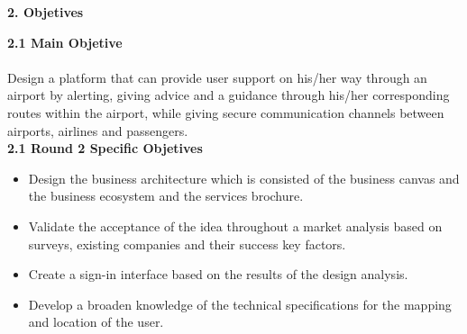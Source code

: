 \documentclass[]{article}
\begin{document}
\Large{
\textbf{2. Objetives}\\
}

\Large{
\textbf{2.1 Main Objetive}\\
}\\
[0.1cm]

Design a platform that can provide user support on his/her way through an airport by alerting, giving advice and a guidance through his/her corresponding routes within the airport, while giving secure communication channels between airports, airlines and passengers.\\

\Large{
\textbf{2.1 Round 2 Specific Objetives}\\
}
\begin{itemize}
	\item Design the business architecture which is consisted of the business canvas and the business ecosystem and the services brochure.
	\item Validate the acceptance of the idea throughout a market analysis based on surveys, existing companies and their success key factors.
	\item Create a sign-in interface based on the results of the design analysis. 
	\item Develop a broaden knowledge of the technical specifications for the mapping and location of the user. 
	
\end{itemize}
\end{document}
